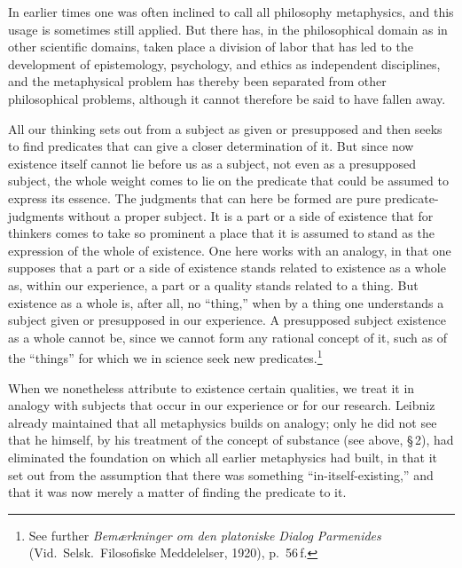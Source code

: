 \documentclass[12pt]{book}
\newcommand{\opage}[1]{\marginnote{\footnotesize\textit{[#1]}}}
\begin{document}
In earlier times one was often inclined to call all philosophy metaphysics, and this usage is sometimes
still applied. But there has, in the philosophical domain as in other scientific domains, taken place a
division of labor that has led to the development of epistemology, psychology, and ethics as independent
disciplines, and the metaphysical problem has thereby been separated from other philosophical problems,
although it cannot therefore be said to have fallen away.

All our thinking sets out from a subject as given or presupposed and then seeks to find predicates that can
give a closer determination of it. But since now existence itself cannot lie before us as a subject, not
even as a presupposed subject, the whole weight comes to lie on the predicate that could be assumed to
express its essence. The judgments that can here be formed are pure predicate-judgments without a proper
subject. It is a part or a side of existence \opage{83}that for thinkers comes to take so prominent a place that it is
assumed to stand as the expression of the whole of existence. One here works with an analogy, in that one
supposes that a part or a side of existence stands related to existence as a whole as, within our
experience, a part or a quality stands related to a thing. But existence as a whole is, after all, no
``thing,'' when by a thing one understands a subject given or presupposed in our experience. A presupposed
subject existence as a whole cannot be, since we cannot form any rational concept of it, such as of the
``things'' for which we in science seek new predicates.\footnote{See further \textit{Bemærkninger om den
platoniske Dialog Parmenides} (Vid.\ Selsk.\ Filosofiske Meddelelser, 1920), p.\ 56\,f.}

When we nonetheless attribute to existence certain qualities, we treat it in analogy with subjects that
occur in our experience or for our research. Leibniz already maintained that all metaphysics builds on
analogy; only he did not see that he himself, by his treatment of the concept of substance (see above,
\S\,2), had eliminated the foundation on which all earlier metaphysics had built, in that it set out from
the assumption that there was something ``in-itself-existing,'' and that it was now merely a matter of
finding the predicate to it.
\end{document}

